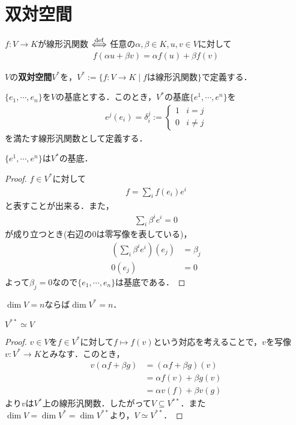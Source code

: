 \documentclass[uplatex]{jsarticle}
\begin{document}
\fi

\section{双対空間}
\begin{teigi}[線形汎関数]
  $f\colon V\to K$が線形汎関数 $\overset{\mathrm{def}}{\Longleftrightarrow}$ 任意の$\alpha,\beta \in K, u,v \in V$に対して
  \begin{align*}
    f(\alpha u+\beta v) = \alpha f(u) + \beta f(v)
  \end{align*}
\end{teigi}
\begin{teigi}[双対空間]
  $V$の\textbf{双対空間}$V^\ast$を，$V^\ast := \{ f\colon V\to K \mid fは線形汎関数 \}$で定義する．
\end{teigi}
\begin{teigi}[双対基底]
  $\{e_1,\cdots,e_n\}$を$V$の基底とする．このとき，$V^\ast$の基底$\{e^1,\cdots,e^n\}$を
  \begin{align*}
    e^j(e_i) = \delta_i^j := \begin{cases}
      1 & i=j \\
      0 & i\neq j
    \end{cases}
  \end{align*}
  を満たす線形汎関数として定義する．
\end{teigi}
\begin{prop}
  $\{e^1,\cdots,e^n\}$は$V^\ast$の基底．
\end{prop}
\begin{proof}
  $f\in V^\ast$に対して
  \begin{align*}
    f = \sum_i f(e_i) e^i
  \end{align*}
  と表すことが出来る．また，
  \begin{align*}
    \sum_i \beta^i e^i = 0
  \end{align*}
  が成り立つとき(右辺の0は零写像を表している)，
  \begin{align*}
    \left(\sum_i \beta^i e^i \right) (e_j) & = \beta_j \\
    0(e_j) & = 0 
  \end{align*}
  よって$\beta_j = 0$なので$\{e_1,\cdots,e_n\}$は基底である．
\end{proof}
\begin{corr}
  $\dim V = n$ならば$\dim V^\ast = n$．
\end{corr}
\begin{prop}
  $V^{\ast \ast} \simeq V$
\end{prop}
\begin{proof}
  $v\in V$を$f\in V^\ast$に対して$f\mapsto f(v)$という対応を考えることで，$v$を写像$v\colon V^\ast \to K$とみなす．このとき，
  \begin{align*}
    v(\alpha f + \beta g) & = (\alpha f + \beta g)(v) \\
    & = \alpha f(v) + \beta g(v) \\
    & = \alpha v(f) + \beta v(g)
  \end{align*}
  より$v$は$V^\ast$上の線形汎関数．したがって$V\subseteq V^{\ast \ast}$．また$\dim V = \dim V^\ast = \dim V^{\ast \ast}$より，$V \simeq V^{\ast \ast}$．
\end{proof}
\end{document}
